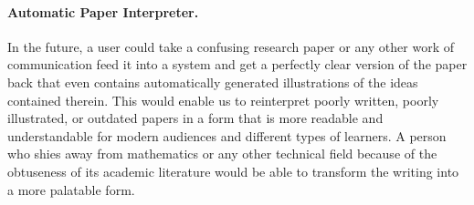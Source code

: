 \documentclass[12pt, letterpaper]{article}
\begin{document}
		\paragraph{Automatic Paper Interpreter.}
		In the future, a user could take a confusing research paper or any other work of communication feed it into a system and get a perfectly clear version of the paper back
		that even contains automatically generated illustrations of the ideas contained therein. This would enable us to reinterpret poorly written,
		poorly illustrated, or outdated papers in a form that is more readable and understandable for modern audiences and different types of learners.
		A person who shies away from mathematics or any other technical field because of the obtuseness of its academic literature would be able to 
		transform the writing into a more palatable form.

\newpage
\end{document}
